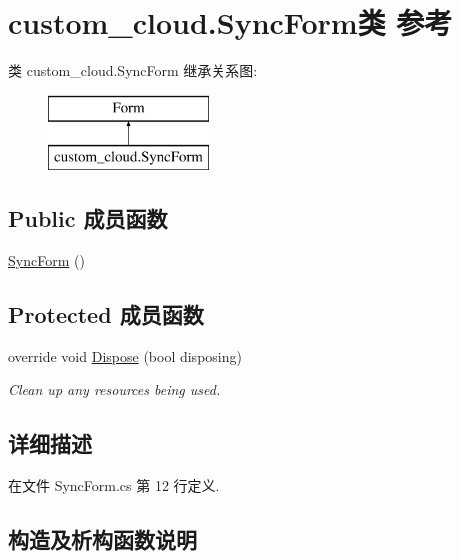 \hypertarget{classcustom__cloud_1_1_sync_form}{}\section{custom\+\_\+cloud.\+Sync\+Form类 参考}
\label{classcustom__cloud_1_1_sync_form}
类 custom\+\_\+cloud.\+Sync\+Form 继承关系图\+:\begin{figure}[H]
\begin{center}
\leavevmode
\includegraphics[height=2.000000cm]{classcustom__cloud_1_1_sync_form}
\end{center}
\end{figure}
\subsection*{Public 成员函数}
\begin{DoxyCompactItemize}
\item 
\hyperlink{classcustom__cloud_1_1_sync_form_a66aaa552c62960125c83310b12676a5d}{Sync\+Form} ()
\end{DoxyCompactItemize}
\subsection*{Protected 成员函数}
\begin{DoxyCompactItemize}
\item 
override void \hyperlink{classcustom__cloud_1_1_sync_form_ad01e9fc54fbb324bbb83babcaee429ff}{Dispose} (bool disposing)
\begin{DoxyCompactList}\small\item\em Clean up any resources being used. \end{DoxyCompactList}\end{DoxyCompactItemize}


\subsection{详细描述}


在文件 Sync\+Form.\+cs 第 12 行定义.



\subsection{构造及析构函数说明}
\mbox{\label{classcustom__cloud_1_1_sync_form_a66aaa552c62960125c83310b12676a5d}} 
